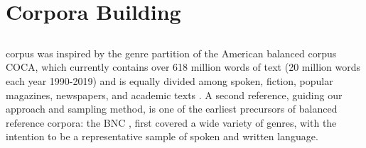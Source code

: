 



\section{Corpora Building}%
\label{sec:DescribeCorpora}

\subsection{\Cabernet} \label{subsec:DescribeCaBeRnet}

\Cabernet corpus was inspired by the genre partition of the American balanced corpus COCA, %
which currently contains over 618 million words of text (20 million words each year 1990-2019) and is equally divided among spoken, fiction, popular magazines, newspapers, and academic texts \citep{davies-2009-the, davies-2010-the}. A second reference, guiding our approach and sampling method, is one of the earliest precursors of balanced reference corpora: the BNC \citep{bnc-2007-the}, first covered a wide variety of genres, with the intention to be a representative sample of spoken and written language.

